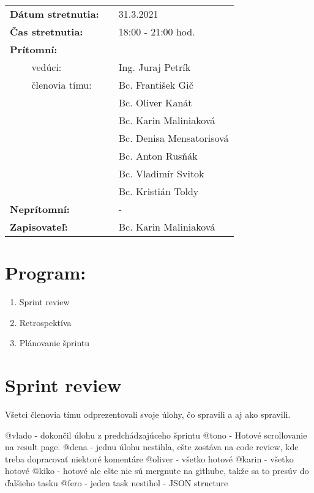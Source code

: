 \documentclass{article}
\begin{document}
    

    \begin{table}[h]
        \begin{tabular}{lllll}
            \multicolumn{3}{l}{\textbf{Dátum stretnutia:}} & & 31.3.2021 \\
            \multicolumn{3}{l}{\textbf{Čas stretnutia:}} & & 18:00 - 21:00 hod. \\
            \multicolumn{3}{l}{\textbf{Prítomní:}} \\
            & & vedúci: & & Ing. Juraj Petrík \\
            & & členovia tímu: & & Bc. František Gič  \\
            & & & & Bc. Oliver Kanát \\
            & & & & Bc. Karin Maliniaková \\
            & & & & Bc. Denisa Mensatorisová \\
            & & & & Bc. Anton Rusňák \\
            & & & & Bc. Vladimír Svitok \\
            & & & & Bc. Kristián Toldy \\
            \multicolumn{3}{l}{\textbf{Neprítomní:}} & & -\\
            \multicolumn{3}{l}{\textbf{Zapisovateľ:}} & & Bc. Karin Maliniaková \\
        \end{tabular}
        \label{tab:grades}
    \end{table}

    \section*{Program:}

    \begin{enumerate}
        \item Sprint review
        \item Retrospektíva
        \item Plánovanie šprintu
    \end{enumerate}

    \section*{Sprint review}

        \textnormal {Všetci členovia tímu odprezentovali svoje úlohy, čo spravili a aj ako spravili.}

        \textnormal {@vlado - dokončil úlohu z predchádzajúceho šprintu }
        \textnormal {@tono - Hotové scrollovanie na result page.}
        \textnormal {@dena - jednu úlohu nestihla, ešte zostáva na code review, kde treba dopracovať niektoré komentáre}
        \textnormal {@oliver - všetko hotové}
        \textnormal {@karin - všetko hotové}
        \textnormal {@kiko - hotové ale ešte nie sú mergnute na githube, takže sa to presúv do ďalšieho tasku}
        \textnormal {@fero - jeden task nestihol - JSON structure}
\end{document}
